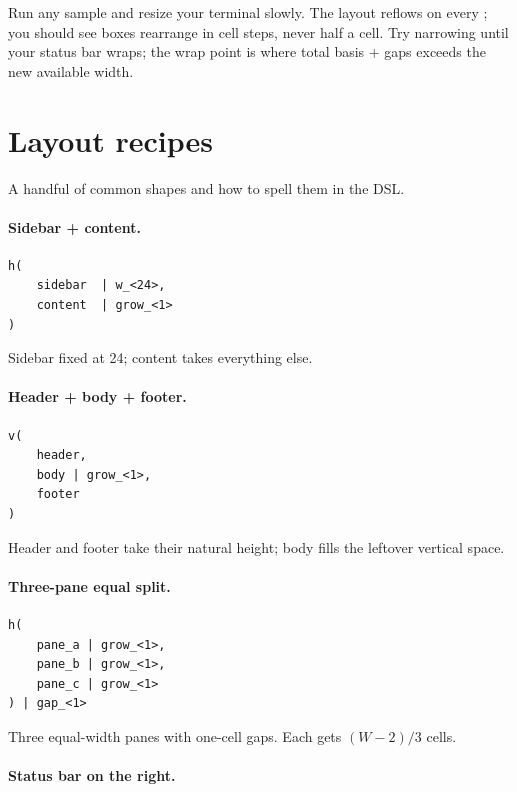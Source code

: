 \begin{tryit}
Run any \maya{} sample and resize your terminal slowly. The
layout reflows on every ; you should see boxes
rearrange in cell steps, never half a cell. Try narrowing until
your status bar wraps; the wrap point is where total basis +
gaps exceeds the new available width.
\end{tryit}

\section{Layout recipes}
\label{sec:layout:recipes}

A handful of common shapes and how to spell them in the DSL.

\paragraph{Sidebar + content.}

\begin{lstlisting}
h(
    sidebar  | w_<24>,
    content  | grow_<1>
)
\end{lstlisting}

Sidebar fixed at 24; content takes everything else.

\paragraph{Header + body + footer.}

\begin{lstlisting}
v(
    header,
    body | grow_<1>,
    footer
)
\end{lstlisting}

Header and footer take their natural height; body fills the
leftover vertical space.

\paragraph{Three-pane equal split.}

\begin{lstlisting}
h(
    pane_a | grow_<1>,
    pane_b | grow_<1>,
    pane_c | grow_<1>
) | gap_<1>
\end{lstlisting}

Three equal-width panes with one-cell gaps. Each gets
$(W - 2) / 3$ cells.

\paragraph{Status bar on the right.}

